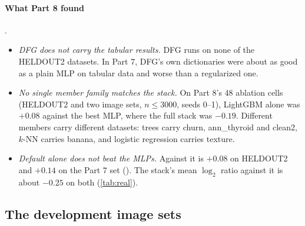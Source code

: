 \paragraph{What Part 8 found} \cite{discretelearners2026}.
\begin{itemize}
\item \emph{DFG does not carry the tabular results.} DFG runs on none of the HELDOUT2 datasets. In Part 7, DFG's own dictionaries were about as good as a plain MLP on tabular data and worse than a regularized one.
\item \emph{No single member family matches the stack.} On Part 8's 48 ablation cells (HELDOUT2 and two image sets, $n\le3000$, seeds 0--1), LightGBM alone was $+0.08$ against the best MLP, where the full stack was $-0.19$. Different members carry different datasets: trees carry churn, ann\_thyroid and clean2, $k$-NN carries banana, and logistic regression carries texture.
\item \emph{Default  alone does not beat the MLPs.} Against  it is $+0.08$ on HELDOUT2 and $+0.14$ on the Part 7 set (). The stack's mean $\log_2$ ratio against it is about $-0.25$ on both (\cref{tab:real}).
\end{itemize}

\subsection{The development image sets}\label{app:further-img}

\begin{table}[tbp]
\centering{\footnotesize\setlength{\tabcolsep}{3.0pt}\renewcommand{\arraystretch}{1.12}
}
\caption{Test error (\%) at every development image cell with a v3 result . Conventions as in \cref{tab:img-cells}. Panel (a): v3 is seed 0 and the references are seed means. Panel (b): v3 and v2 are seed 0, and ,  and v1 are seed means. ``Fashion'' is Fashion-MNIST. Source: .}
\label{tab:img-cells-dev}
\end{table}

\begin{table}[tbp]
\centering{\footnotesize\setlength{\tabcolsep}{5pt}
}
\caption{v3 against each image reference on the development sets . Conventions as in \cref{tab:img-summary}. Both panels compare single v3 fits (seed 0) with the references' seed means where 3 seeds exist (v2 in panel (b), , ,  and all $n=60000$ cells are seed 0). Source: .}
\label{tab:img-summary-dev}
\end{table}

